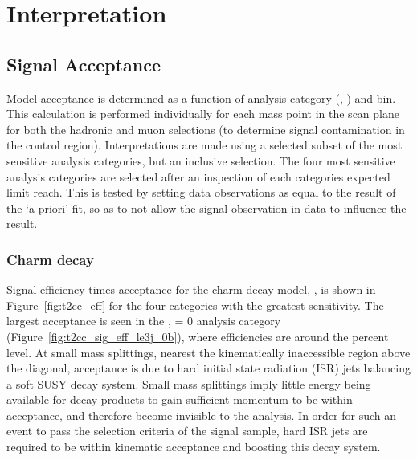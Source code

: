 \chapter{Interpretation}
\label{ch:interpretation}

\ifpdf
    \graphicspath{{Chapter9/Figs/Raster/}{Chapter9/Figs/PDF/}{Chapter9/Figs/}}
\else
    \graphicspath{{Chapter9/Figs/Vector/}{Chapter9/Figs/}}
\fi

\section{Signal Acceptance}  %
\label{sec:interpretation_acceptance}

Model acceptance is determined as a function of analysis category (\nb, \nj) and
\HT bin. This calculation is performed individually for each mass point in the
scan plane for both the hadronic and muon selections (to determine 
signal contamination in the control region). Interpretations are made using a
selected subset of the most sensitive analysis 
categories, but an inclusive \HT selection. 
The four most sensitive analysis categories are selected after an inspection of
each categories expected limit reach. This is tested by setting data observations
as equal to the result of the `a priori' fit, so as to not allow the signal
observation in data to influence the result.

\subsection{Charm decay}
\label{sec:t2cc_eff}
Signal efficiency times acceptance for the charm decay model, \Ttwocc,  is shown
in
Figure~\ref{fig:t2cc_eff} for the four categories with the greatest sensitivity.
The largest acceptance is seen in the \njlow, 
\nb= 0 analysis category (Figure~\ref{fig:t2cc_sig_eff_le3j_0b}), where efficiencies
are around the percent level. At 
small mass splittings, nearest the kinematically inaccessible region above the diagonal, 
acceptance is due to hard initial state radiation (ISR) jets balancing a soft 
SUSY decay system. Small mass splittings imply little energy being available for
decay products to gain sufficient momentum to be within acceptance, and therefore 
become invisible to the analysis. In order for such an event to pass the 
selection criteria of the signal sample, hard ISR jets are required to be within
kinematic acceptance and boosting this decay system.

